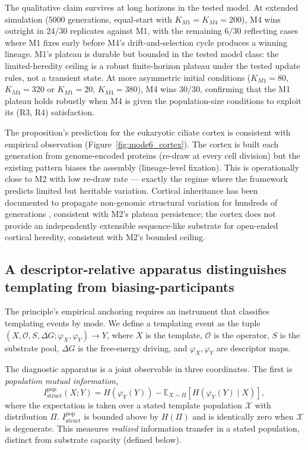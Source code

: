 \documentclass[aps,prx,reprint,amsmath,amssymb,floatfix,superscriptaddress,nofootinbib]{revtex4-2}
\theoremstyle{plain-thm}
\theoremstyle{definition-thm}
\newcommand{\Istructpop}{I_{\mathrm{struct}}^{\mathrm{pop}}}
\newcommand{\descX}{\varphi_X}
\newcommand{\descY}{\varphi_Y}
\newcommand{\Op}{\mathcal{O}}
\begin{document}
The qualitative claim survives at long horizons in the tested model. At extended simulation (5000 generations, equal-start with $K_{M1} = K_{M4} = 200$), M4 wins outright in 24/30 replicates against M1, with the remaining 6/30 reflecting cases where M1 fixes early before M4's drift-and-selection cycle produces a winning lineage. M1's plateau is durable but bounded in the tested model class: the limited-heredity ceiling is a robust finite-horizon plateau under the tested update rules, not a transient state. At more asymmetric initial conditions ($K_{M1} = 80$, $K_{M4} = 320$ or $K_{M1} = 20$, $K_{M4} = 380$), M4 wins 30/30, confirming that the M1 plateau holds robustly when M4 is given the population-size conditions to exploit its (R3, R4) satisfaction.

The proposition's prediction for the eukaryotic ciliate cortex is consistent with empirical observation (Figure~\ref{fig:mode6_cortex}). The cortex is built each generation from genome-encoded proteins (re-draw at every cell division) but the existing pattern biases the assembly (lineage-level fixation). This is operationally close to M2 with low re-draw rate --- exactly the regime where the framework predicts limited but heritable variation. Cortical inheritance has been documented to propagate non-genomic structural variation for hundreds of generations \citep{BeissonSonneborn1965}, consistent with M2's plateau persistence; the cortex does not provide an independently extensible sequence-like substrate for open-ended cortical heredity, consistent with M2's bounded ceiling.

\subsection{A descriptor-relative apparatus distinguishes templating from biasing-participants}

The principle's empirical anchoring requires an instrument that classifies templating events by mode. We define a templating event as the tuple $(X, \Op, S, \Delta G; \descX, \descY) \to Y$, where $X$ is the template, $\Op$ is the operator, $S$ is the substrate pool, $\Delta G$ is the free-energy driving, and $\descX, \descY$ are descriptor maps.

The diagnostic apparatus is a joint observable in three coordinates. The first is \textit{population mutual information},
\begin{equation}
\Istructpop(X; Y) = H(\descY(Y)) - \mathbb{E}_{X \sim \Pi}\left[H(\descY(Y) \mid X)\right],
\end{equation}
where the expectation is taken over a stated template population $\mathcal{X}$ with distribution $\Pi$. $\Istructpop$ is bounded above by $H(\Pi)$ and is identically zero when $\mathcal{X}$ is degenerate. This measures \textit{realized} information transfer in a stated population, distinct from substrate capacity (defined below).
\end{document}
